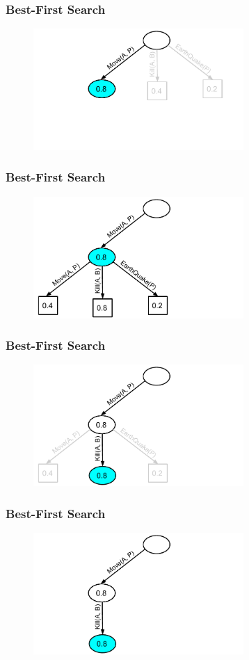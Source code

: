 \documentclass{beamer}
\begin{document}
\begin{frame}[fragile]
\frametitle{Best-First Search}
\begin{figure}[h]
	\includegraphics[width=8cm]{Diagrams/BestFirst/BestTreeTwo.pdf}
	\centering
\end{figure}
\end{frame}

\begin{frame}[fragile]
\frametitle{Best-First Search}
\begin{figure}[h]
	\includegraphics[width=8cm]{Diagrams/BestFirst/BestTreeThree.pdf}
	\centering
\end{figure}
\end{frame}

\begin{frame}[fragile]
\frametitle{Best-First Search}
\begin{figure}[h]
	\includegraphics[width=8cm]{Diagrams/BestFirst/BestTreeFour.pdf}
	\centering
\end{figure}
\end{frame}

\begin{frame}[fragile]
\frametitle{Best-First Search}
\begin{figure}[h]
	\includegraphics[width=8cm]{Diagrams/BestFirst/BestTreeFive.pdf}
	\centering
\end{figure}
\end{frame}
\end{document}
